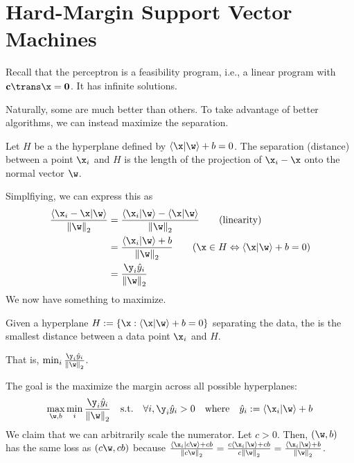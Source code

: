 \documentclass[class=cs480,notes,tikz]{agony}
\begin{document}
\section{Hard-Margin Support Vector Machines}\label{ch:hsvm}


Recall that the perceptron is a feasibility program, i.e.,
a linear program with $\vb c\trans \x = \vb 0$.
It has infinite solutions.

Naturally, some are much better than others.
To take advantage of better algorithms, we can instead maximize the separation.

Let $H$ be a the hyperplane defined by $\ip{\x}{\w} + b = 0$.
The separation (distance) between a point $\x_i$ and $H$
is the length of the projection of \textcolor{blue}{$\x_i-\x$}
onto the normal vector \textcolor{orange}{$\w$}.
\begin{center}
\end{center}
Simplfiying, we can express this as
\begin{align*}
  \frac{\ip{\x_i-\x}{\w}}{\norm{\w}_2}
   & = \frac{\ip{\x_i}{\w} - \ip{\x}{\w}}{\norm{\w}_2} \tag{linearity}                \\
   & = \frac{\ip{\x_i}{\w} + b}{\norm{\w}_2} \tag{$\x \in H \Harr \ip{\x}{\w}+b = 0$} \\
   & = \frac{\y_i\hat y_i}{\norm{\w}_2}
\end{align*}
We now have something to maximize.
\begin{defn}[margin]
  Given a hyperplane $H := \{\x : \ip{\x}{\w} + b = 0\}$ separating the data,
  the  is the smallest distance between a data point $\x_i$ and $H$.

  That is, $\min_i \frac{\y_i \hat y_i}{\norm{\w}_2}$.
\end{defn}
The goal is the maximize the margin across all possible hyperplanes:
\[ \max_{\w,b} \min_i \frac{\y_i \hat y_i}{\norm{\w}_2} \qq{s.t.} \forall i, \y_i \hat y_i > 0 \qq{where} \hat y_i := \ip{\x_i}{\w} + b \]
We claim that we can arbitrarily scale the numerator.
Let $c>0$.
Then, $(\w,b)$ has the same loss as $(c\w,cb)$ because
$\frac{\ip{\x_i}{c\w}+cb}{\norm{c\w}_2}
  = \frac{c\ip{\x_i}{\w}+cb}{c\norm{\w}_2}
  = \frac{\ip{\x_i}{\w}+b}{\norm{\w}_2}$.
\end{document}
